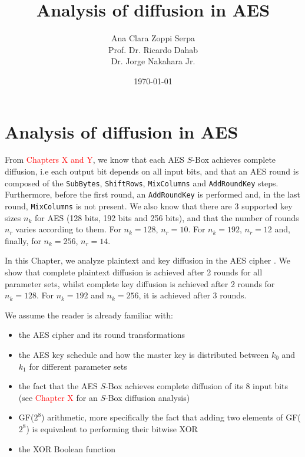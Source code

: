 \documentclass{report}
\title{Analysis of diffusion in AES}
\author{Ana Clara Zoppi Serpa\\ Prof. Dr. Ricardo Dahab \\ Dr. Jorge Nakahara Jr.}
\date{\today}
\begin{document}

\maketitle

\tableofcontents

\chapter{Analysis of diffusion in AES}
From \textcolor{red}{Chapters X and Y}, we know that each AES $S$-Box achieves complete diffusion, i.e each output bit depends on all input bits, and that an AES round is composed of the \texttt{SubBytes}, \texttt{ShiftRows}, \texttt{MixColumns} and \texttt{AddRoundKey} steps. Furthermore, before the first round, an \texttt{AddRoundKey} is performed and, in the last round, \texttt{MixColumns} is not present. We also know that there are 3 supported key sizes $n_k$ for AES (128 bits, 192 bits and 256 bits), and that the number of rounds $n_r$ varies according to them. For $n_k = 128$, $n_r = 10$. For $n_k = 192$, $n_r = 12$ and, finally, for $n_k = 256$, $n_r = 14$.

In this Chapter, we analyze plaintext and key diffusion in the AES cipher \cite{AES-FIPS}. We show that complete plaintext diffusion is achieved after 2 rounds for all parameter sets, whilst complete key diffusion is achieved after 2 rounds for $n_k = 128$. For $n_k = 192$ and $n_k = 256$, it is achieved after 3 rounds.

We assume the reader is already familiar with:
\begin{itemize}
    \item the AES cipher \cite{AES-FIPS} and its round transformations
    \item the AES key schedule and how the master key is distributed between $k_0$ and $k_1$ for different parameter sets
    \item the fact that the AES $S$-Box achieves complete diffusion of its 8 input bits (see \textcolor{red}{Chapter X} for an $S$-Box diffusion analysis)
    \item GF($2^8$) arithmetic, more specifically the fact that adding two elements of GF($2^8$) is equivalent to performing their bitwise XOR
    \item the XOR Boolean function
\end{itemize}
\end{document}
